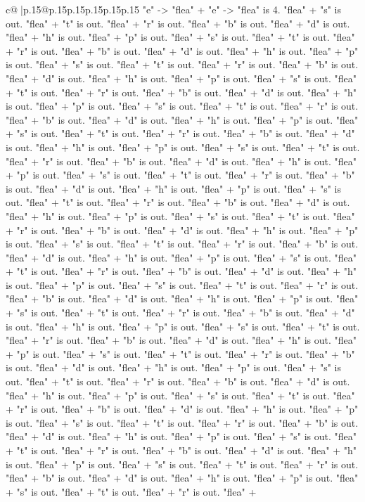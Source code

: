 \documentclass{article}
\begin{document}
{\begin{supertabular}{c@{$\;$}|p{.15\linewidth}@{}p{.15\linewidth}p{.15\linewidth}p{.15\linewidth}p{.15\linewidth}p{.15\linewidth}}
{{{"e" {-}> "flea" + "e" {-}> "flea" is 4. "flea" + "s" is out. "flea" + "t" is out. "flea" + "r" is out. "flea" + "b" is out. "flea" + "d" is out. "flea" + "h" is out. "flea" + "p" is out. "flea" + "s" is out. "flea" + "t" is out. "flea" + "r" is out. "flea" + "b" is out. "flea" + "d" is out. "flea" + "h" is out. "flea" + "p" is out. "flea" + "s" is out. "flea" + "t" is out. "flea" + "r" is out. "flea" + "b" is out. "flea" + "d" is out. "flea" + "h" is out. "flea" + "p" is out. "flea" + "s" is out. "flea" + "t" is out. "flea" + "r" is out. "flea" + "b" is out. "flea" + "d" is out. "flea" + "h" is out. "flea" + "p" is out. "flea" + "s" is out. "flea" + "t" is out. "flea" + "r" is out. "flea" + "b" is out. "flea" + "d" is out. "flea" + "h" is out. "flea" + "p" is out. "flea" + "s" is out. "flea" + "t" is out. "flea" + "r" is out. "flea" + "b" is out. "flea" + "d" is out. "flea" + "h" is out. "flea" + "p" is out. "flea" + "s" is out. "flea" + "t" is out. "flea" + "r" is out. "flea" + "b" is out. "flea" + "d" is out. "flea" + "h" is out. "flea" + "p" is out. "flea" + "s" is out. "flea" + "t" is out. "flea" + "r" is out. "flea" + "b" is out. "flea" + "d" is out. "flea" + "h" is out. "flea" + "p" is out. "flea" + "s" is out. "flea" + "t" is out. "flea" + "r" is out. "flea" + "b" is out. "flea" + "d" is out. "flea" + "h" is out. "flea" + "p" is out. "flea" + "s" is out. "flea" + "t" is out. "flea" + "r" is out. "flea" + "b" is out. "flea" + "d" is out. "flea" + "h" is out. "flea" + "p" is out. "flea" + "s" is out. "flea" + "t" is out. "flea" + "r" is out. "flea" + "b" is out. "flea" + "d" is out. "flea" + "h" is out. "flea" + "p" is out. "flea" + "s" is out. "flea" + "t" is out. "flea" + "r" is out. "flea" + "b" is out. "flea" + "d" is out. "flea" + "h" is out. "flea" + "p" is out. "flea" + "s" is out. "flea" + "t" is out. "flea" + "r" is out. "flea" + "b" is out. "flea" + "d" is out. "flea" + "h" is out. "flea" + "p" is out. "flea" + "s" is out. "flea" + "t" is out. "flea" + "r" is out. "flea" + "b" is out. "flea" + "d" is out. "flea" + "h" is out. "flea" + "p" is out. "flea" + "s" is out. "flea" + "t" is out. "flea" + "r" is out. "flea" + "b" is out. "flea" + "d" is out. "flea" + "h" is out. "flea" + "p" is out. "flea" + "s" is out. "flea" + "t" is out. "flea" + "r" is out. "flea" + "b" is out. "flea" + "d" is out. "flea" + "h" is out. "flea" + "p" is out. "flea" + "s" is out. "flea" + "t" is out. "flea" + "r" is out. "flea" + "b" is out. "flea" + "d" is out. "flea" + "h" is out. "flea" + "p" is out. "flea" + "s" is out. "flea" + "t" is out. "flea" + "r" is out. "flea" + "b" is out. "flea" + "d" is out. "flea" + "h" is out. "flea" + "p" is out. "flea" + "s" is out. "flea" + "t" is out. "flea" + "r" is out. "flea" + "b" is out. "flea" + "d" is out. "flea" + "h" is out. "flea" + "p" is out. "flea" + "s" is out. "flea" + "t" is out. "flea" + "r" is out. "flea" + "b" is out. "flea" + "d" is out. "flea" + "h" is out. "flea" + "p" is out. "flea" + "s" is out. "flea" + "t" is out. "flea" + "r" is out. "flea" + "b" is out. "flea" + "d" is out. "flea" + "h" is out. "flea" + "p" is out. "flea" + "s" is out. "flea" + "t" is out. "flea" + "r" is out. "flea" + }}}
\end{supertabular}}
\end{document}
